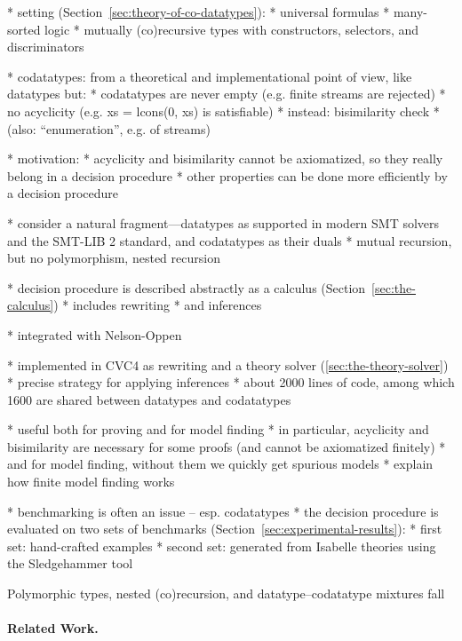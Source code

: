 \documentclass[a4paper,oribibl,envcountsame,draft]{llncs}
\begin{document}
  * setting (Section~\ref{sec:theory-of-co-datatypes}):
    * universal formulas
    * many-sorted logic
    * mutually (co)recursive types with constructors, selectors, and
      discriminators

  * codatatypes: from a theoretical and implementational point of view, like
      datatypes but:
    * codatatypes are never empty (e.g. finite streams are rejected)
    * no acyclicity (e.g. xs = lcons(0, xs) is satisfiable)
    * instead: bisimilarity check
    * (also: ``enumeration'', e.g. of streams)

  * motivation:
    * acyclicity and bisimilarity cannot be axiomatized, so they really belong in
      a decision procedure
    * other properties can be done more efficiently by a decision procedure

  * consider a natural fragment---datatypes as supported in modern SMT solvers
    and the SMT-LIB 2 standard, and codatatypes as their duals
    * mutual recursion, but no polymorphism, nested recursion

  * decision procedure is described abstractly as a calculus
    (Section~\ref{sec:the-calculus})
    * includes rewriting
    * and inferences

  * integrated with Nelson-Oppen

  * implemented in CVC4 as rewriting and a theory solver
    (\ref{sec:the-theory-solver})
    * precise strategy for applying inferences
    * about 2000 lines of code, among which 1600 are shared between datatypes
      and codatatypes

  * useful both for proving and for model finding
    * in particular, acyclicity and bisimilarity are necessary for some proofs
      (and cannot be axiomatized finitely)
    * and for model finding, without them we quickly get spurious models
    * explain how finite model finding works


  * benchmarking is often an issue -- esp. codatatypes
  * the decision procedure is evaluated on two sets of benchmarks
    (Section~\ref{sec:experimental-results}):
    * first set: hand-crafted examples
    * second set: generated from Isabelle theories using the Sledgehammer tool

Polymorphic types, nested (co)recursion, and datatype--codatatype mixtures fall

\paragraph{Related Work.}
\end{document}
